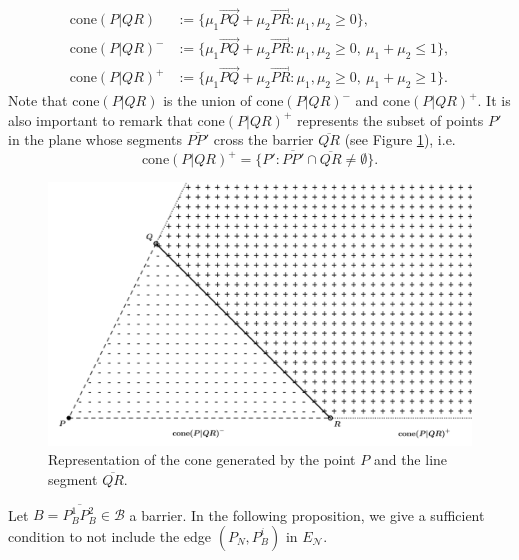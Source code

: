 \documentclass[a4paper,  review, authoryear, 1p.]{elsarticle}
\newcommand{\EN}{{E^{}_{\mathcal N}}}
\newcommand{\segment}[2]{\overline{#1#2}}
\begin{document}
		\begin{align*}
			\text{cone}(P|QR)&:=\{\mu_1 \overrightarrow{PQ}+\mu_2\overrightarrow{PR}:\mu_1,\mu_2\geq 0\},\\
			\text{cone}(P|QR)^-&:=\{\mu_1 \overrightarrow{PQ}+\mu_2\overrightarrow{PR}:\mu_1,\mu_2\geq 0,\:\mu_1+\mu_2\leq 1\},\\
			\text{cone}(P|QR)^+&:=\{\mu_1 \overrightarrow{PQ}+\mu_2\overrightarrow{PR}:\mu_1,\mu_2\geq 0,\:\mu_1+\mu_2\geq 1\}.
		\end{align*}
		Note that $\text{cone}(P|QR)$ is the union of $\text{cone}(P|QR)^-$ and $\text{cone}(P|QR)^+$. It is also important to remark that $\text{cone}(P|QR)^+$ represents the subset of points $P'$ in the plane whose segments $\segment{P}{P'}$ cross the barrier $\overline{QR}$ (see Figure \ref{fig:cones}), i.e.
		$$\text{cone}(P|QR)^+=\{P':\overline{PP'}\cap\overline{QR}\neq\emptyset\}.$$
		
		\begin{figure}[h!]
			\centering
			\includegraphics[width=0.75\linewidth]{figures/cones}
			\caption{Representation of the cone generated by the point $P$ and the line segment $\segment{Q}{R}$.}
			\label{fig:cones}
		\end{figure}
		Let $B = \overline{P^1_BP^2_B}\in\mathcal B$ a barrier. In the following proposition, we give a sufficient condition to not include the edge $(P^{}_N, P^i_B)$ in $\EN$.
		
\end{document}
